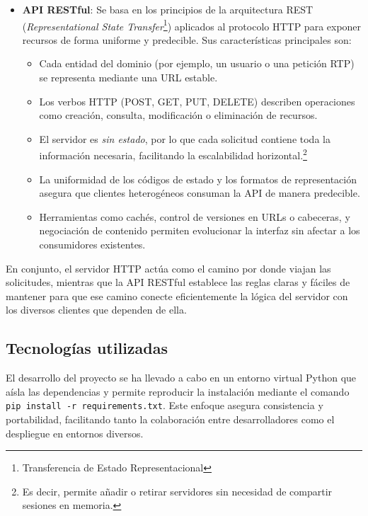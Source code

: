 \begin{itemize}
    \item \textbf{API RESTful}: Se basa en los principios de la arquitectura REST (\textit{Representational State Transfer}\footnote{Transferencia de Estado Representacional}) aplicados al protocolo HTTP para exponer recursos de forma uniforme y predecible. Sus características principales son:
    \begin{itemize}
        \item Cada entidad del dominio (por ejemplo, un usuario o una petición RTP) se representa mediante una URL estable.
        \item Los verbos HTTP (POST, GET, PUT, DELETE) describen operaciones como creación, consulta, modificación o eliminación de recursos.
        \item El servidor es \textit{sin estado}, por lo que cada solicitud contiene toda la información necesaria, facilitando la escalabilidad horizontal.\footnote{Es decir, permite añadir o retirar servidores sin necesidad de compartir sesiones en memoria.}
        \item La uniformidad de los códigos de estado y los formatos de representación asegura que clientes heterogéneos consuman la API de manera predecible.
        \item Herramientas como cachés, control de versiones en URLs o cabeceras, y negociación de contenido permiten evolucionar la interfaz sin afectar a los consumidores existentes.
    \end{itemize}
\end{itemize}

En conjunto, el servidor HTTP actúa como el camino por donde viajan las solicitudes, mientras que la API RESTful establece las reglas claras y fáciles de mantener para que ese camino conecte eficientemente la lógica del servidor con los diversos clientes que dependen de ella.
\subsection{Tecnologías utilizadas}
\label{subsec:Herramientas de desarrollo}
El desarrollo del proyecto se ha llevado a cabo en un entorno virtual Python que aísla las dependencias y permite reproducir la instalación mediante el comando \texttt{pip install -r requirements.txt}. Este enfoque asegura consistencia y portabilidad, facilitando tanto la colaboración entre desarrolladores como el despliegue en entornos diversos.

